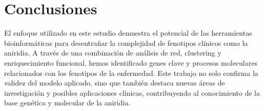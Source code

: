 \section{Conclusiones}

El enfoque utilizado en este estudio demuestra el potencial de las herramientas bioinformáticas para desentrañar la complejidad de fenotipos clínicos como la aniridia. A través de una combinación de análisis de red, clustering y enriquecimiento funcional, hemos identificado genes clave y procesos moleculares relacionados con los fenotipos de la enfermedad. Este trabajo no solo confirma la validez del modelo aplicado, sino que también destaca nuevas áreas de investigación y posibles aplicaciones clínicas, contribuyendo al conocimiento de la base genética y molecular de la aniridia.